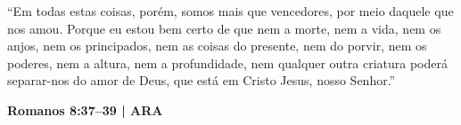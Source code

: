 
\thispagestyle{empty}

\vspace*{\fill}

\noindent\hfill
\begin{minipage}{0.50\textwidth}
    \raggedleft
    \fontsize{11}{14}\selectfont

    ``Em todas estas coisas, porém, somos mais que
    vencedores, por meio daquele que nos amou.
    Porque eu estou bem certo de que nem a morte,
    nem a vida, nem os anjos, nem os principados,
    nem as coisas do presente, nem do porvir,
    nem os poderes, nem a altura, nem a
    profundidade, nem qualquer outra criatura
    poderá separar-nos do amor de Deus, que está
    em Cristo Jesus, nosso Senhor.''

    \vspace{0.5cm}

    \textbf{Romanos 8:37--39 | ARA}
\end{minipage}

\vspace*{1.5cm}

